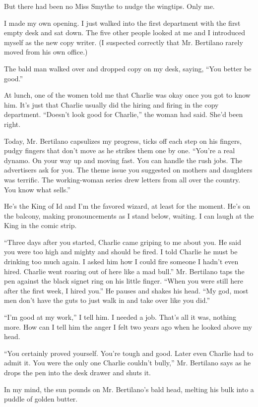 \documentclass[twoside,10pt]{book}
\begin{document}
But there had been no Miss Smythe to nudge the wingtips. Only me.

I made my own opening. I just walked into the first department with the
first empty desk and sat down. The five other people looked at me and I
introduced myself as the new copy writer. (I sus­pected correctly that
Mr. Bertilano rarely moved from his own office.)

The bald man walked over and dropped copy on my desk, saying, ``You
better be good.''

At lunch, one of the women told me that Charlie was okay once you got to
know him. It's just that Charlie usually did the hiring and firing in
the copy department. ``Doesn't look good for Charlie,'' the woman had
said. She'd been right.

Today, Mr. Bertilano capsulizes my progress, ticks off each step on his
fingers, pudgy fingers that don't move as he strikes them one by one.
``You're a real dynamo. On your way up and moving fast. You can handle
the rush jobs. The advertisers ask for you. The theme issue you
suggested on mothers and daughters was terrific. The working-woman
series drew letters from all over the country. You know what sells.''

He's the King of Id and I'm the favored wizard, at least for the moment.
He's on the balcony, making pronouncements as I stand below, waiting. I
can laugh at the King in the comic strip.

``Three days after you started, Charlie came griping to me about you. He
said you were too high and mighty and should be fired. I told Charlie he
must be drinking too much again. I asked him how I could fire someone I
hadn't even hired. Charlie went roaring out of here like a mad bull.''
Mr. Bertilano taps the pen against the black signet ring on his little
finger. ``When you were still here after the first week, I hired you.''
He pauses and shakes his head. ``My god, most men don't have the guts to
just walk in and take over like you did.''

``I'm good at my work,'' I tell him. I needed a job. That's all it was,
nothing more. How can I tell him the anger I felt two years ago when he
looked above my head.

``You certainly proved yourself. You're tough and good. Later even
Charlie had to admit it. You were the only one Charlie couldn't bully,''
Mr. Bertilano says as he drops the pen into the desk drawer and shuts
it.

In my mind, the sun pounds on Mr. Bertilano's bald head, melting his
bulk into a puddle of golden butter.
\end{document}
